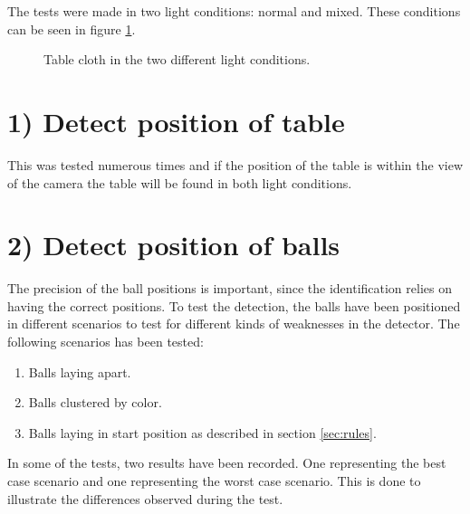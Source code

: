 The tests were made in two light conditions: normal and mixed. These conditions can be seen in figure \ref{fig:difflightcon}.

\begin{figure}[H]
  \centering
  \quad           
   \caption{Table cloth in the two different light conditions.}
  \label{fig:difflightcon}
\end{figure}


\section{1) Detect position of table}

This was tested numerous times and if the position of the table is within the view of the camera the table will be found in both light conditions.

\section{2) Detect position of balls}
The precision of the ball positions is important, since the identification relies on having the correct positions. To test the detection, the balls have been positioned in different scenarios to test for different kinds of weaknesses in the detector. The following scenarios has been tested:
\begin{enumerate}
	\item Balls laying apart.
	\item Balls clustered by color.
	\item Balls laying in start position as described in section \ref{sec:rules}.
\end{enumerate}
In some of the tests, two results have been recorded. One representing the best case scenario and one representing the worst case scenario. This is done to illustrate the differences observed during the test.

